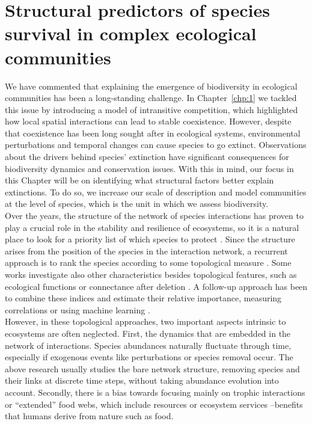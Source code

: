 \chapter{Structural predictors of species survival in complex ecological communities} \label{chp:2}
We have commented that explaining the emergence of biodiversity in ecological communities has been a long-standing challenge. In Chapter~\ref{chp:1}  we tackled this issue by introducing a model of intransitive competition, which highlighted how local spatial interactions can lead to stable coexistence. However, despite that  coexistence has been long sought after in ecological systems, environmental perturbations and temporal changes can cause species to go extinct. Observations about the drivers behind species' extinction have significant consequences for biodiversity dynamics and conservation issues. With this in mind, our focus in this Chapter will be on identifying what structural factors better explain extinctions. To do so, we increase our scale of description and model communities at the level of species, which is the unit in which we assess biodiversity.\\

 Over the years, the structure of the network of species interactions has proven to play a crucial role in the stability and resilience of ecosystems, so it is a natural place to look for a priority list of which species to protect \cite{Holme2021NetworksConsequences}. Since the structure arises from the position of the species in the interaction network, a recurrent approach is to rank the species according to some topological measure \cite{McDonald-Madden2016UsingEcosystems,Keyes2021AnLosses}. Some works investigate also other characteristics besides topological features, such as ecological functions \cite{Jordan2008IdentifyingNetworks} or connectance after deletion \cite{Torres-Alruiz2013AIndexes}. A follow-up approach has been to combine these indices \cite{ Gouveia2021,Estrada2007CharacterizationSpecies} and estimate their relative importance, measuring correlations or using machine learning \cite{Gouveia2021}.\\

However, in these topological approaches, two important aspects intrinsic to ecosystems are often neglected. First, the dynamics that are embedded in the network of interactions. Species abundances naturally fluctuate through time, especially if exogenous events like perturbations or species removal occur. The above research usually studies the bare network structure, removing species and their links at discrete time steps, without taking abundance evolution into account. Secondly, there is a bias towards focusing mainly  on trophic interactions \cite{Allesina2009GooglingCoextinctions,Estrada2007CharacterizationSpecies,Keyes2021AnLosses,Torres-Alruiz2013AIndexes,Jordan2008IdentifyingNetworks,Gouveia2021} or ``extended'' food webs, which include resources \cite{Bellingeri2013RobustnessResources} or ecosystem services \cite{McDonald-Madden2016UsingEcosystems} --benefits that humans derive from nature such as food.\\

